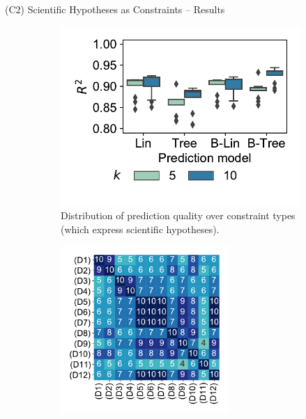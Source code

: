 \documentclass[en, navbarinline, handout]{sdqbeamer}
\begin{document}
\begin{frame}[t]{(C2) Scientific Hypotheses as Constraints -- Results}
	\begin{figure}
		\centering
		\begin{subfigure}{0.48\textwidth}
			\centering
			\includegraphics[width=\textwidth, trim={0 20 0 15}, clip]{plots/ms-prediction-performance-cardinality.pdf}
			\caption*{Distribution of prediction quality over constraint types (which express scientific hypotheses).}
		\end{subfigure}
		\hfill
		\begin{subfigure}{0.48\textwidth}
			\centering
			\includegraphics[width=0.7\textwidth, trim={0 20 0 15}, clip]{plots/ms-selected-similarity-card10.pdf}

\end{subfigure}
\end{figure}
\end{frame}
\end{document}
